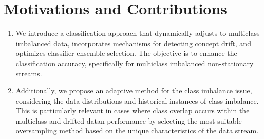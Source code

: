   
  \section{Motivations and Contributions} \label{sec:4_2_motivation}
  \begin{enumerate}[nosep]
    \item We introduce a classification approach that dynamically adjusts to multiclass imbalanced data, incorporates mechanisms for
    detecting concept drift, and optimizes classifier ensemble selection. The objective is to enhance the classification accuracy, specifically for multiclass imbalanced non-stationary streams.
   \item Additionally, we propose an adaptive method for the class imbalance issue, considering the data distributions and historical instances of class imbalance. This is particularly relevant in cases where class overlap occurs within the multiclass and drifted datan performance by selecting the most suitable oversampling method based on the unique characteristics of the data stream. 
    \end{enumerate}